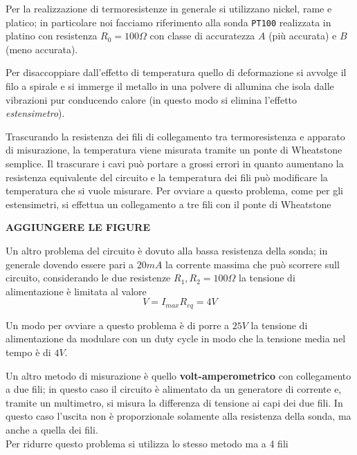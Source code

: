 	Per la realizzazione di termoresistenze in generale si utilizzano nickel, rame e platico; in particolare noi facciamo riferimento alla sonda \texttt{PT100} realizzata in platino con resistenza $R_0 = 100 \Omega$ con classe di accuratezza $A$ (più accurata) e $B$ (meno accurata).
	
	Per disaccoppiare dall'effetto di temperatura quello di deformazione si avvolge il filo a spirale e si immerge il metallo in una polvere di allumina che isola dalle vibrazioni pur conducendo calore (in questo modo si elimina l'effetto \textit{estensimetro}).
	
	Trascurando la resistenza dei fili di collegamento tra termoresistenza e apparato di misurazione, la temperatura viene misurata tramite un ponte di Wheatstone semplice. Il trascurare i cavi può portare a grossi errori in quanto aumentano la resistenza equivalente del circuito e la temperatura dei fili può modificare la temperatura che si vuole misurare. Per ovviare a questo problema, come per gli estensimetri, si effettua un collegamento a tre fili con il ponte di Wheatstone
	
	\textbf{AGGIUNGERE LE FIGURE} 
	
	Un altro problema del circuito è dovuto alla bassa resistenza della sonda; in generale dovendo essere pari a $20mA$ la corrente massima che può scorrere sull circuito, considerando le due resistenze $R_1,R_2= 100\Omega$ la tensione di alimentazione è limitata al valore
	\[ V= I_{max} R_{eq} = 4V \]
	
	Un modo per ovviare a questo problema è di porre a $25V$ la tensione di alimentazione da modulare con un duty cycle in modo che la tensione media nel tempo è di $4V$.
	
	Un altro metodo di misurazione è quello \textbf{volt-amperometrico} con collegamento a due fili; in questo caso il circuito è alimentato da un generatore di corrente e, tramite un multimetro, si misura la differenza di tensione ai capi dei due fili. In questo caso l'uscita non è proporzionale solamente alla resistenza della sonda, ma anche a quella dei fili. \\
	Per ridurre questo problema si utilizza lo stesso metodo ma a 4 fili
	
	
	
	
	
	
	
	
	
	
	
